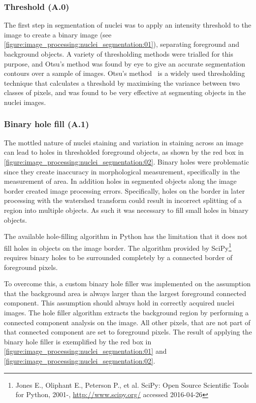 \subsubsection{Threshold (A.0)}
The first step in segmentation of nuclei was to apply an intensity threshold to the image to create a binary image (see \autoref{figure:image_processing:nuclei_segmentation:01}), separating foreground and background objects. A variety of thresholding methods were trialled for this purpose, and Otsu's method was found by eye to give an accurate segmentation contours over a sample of images. Otsu's method~\cite{Otsu1979} is a widely used thresholding technique that calculates a threshold by maximising the variance between two classes of pixels, and was found to be very effective at segmenting objects in the nuclei images.

\subsubsection{Binary hole fill (A.1)}
The mottled nature of nuclei staining and variation in staining across an image can lead to holes in thresholded foreground objects, as shown by the red box in \autoref{figure:image_processing:nuclei_segmentation:02}. Binary holes were problematic since they create inaccuracy in morphological measurement, specifically in the measurement of area. In addition holes in segmented objects along the image border created image processing errors. Specifically, holes on the border in later processing with the watershed transform could result in incorrect splitting of a region into multiple objects. As such it was necessary to fill small holes in binary objects.

The available hole-filling algorithm in Python has the limitation that it does not fill holes in objects on the image border. The algorithm provided by SciPy\footnote{Jones E., Oliphant E., Peterson P., et al. SciPy: Open Source Scientific Tools for Python, 2001-, \url{http://www.scipy.org/} accessed 2016-04-26} requires binary holes to be surrounded completely by a connected border of foreground pixels.

To overcome this, a custom binary hole filler was implemented on the assumption that the background area is always larger than the largest foreground connected component. This assumption should always hold in correctly acquired nuclei images. The hole filler algorithm extracts the background region by performing a connected component analysis on the image. All other pixels, that are not part of that connected component are set to foreground pixels. The result of applying the binary hole filler is exemplified by the red box in \autoref{figure:image_processing:nuclei_segmentation:01} and \autoref{figure:image_processing:nuclei_segmentation:02}.

